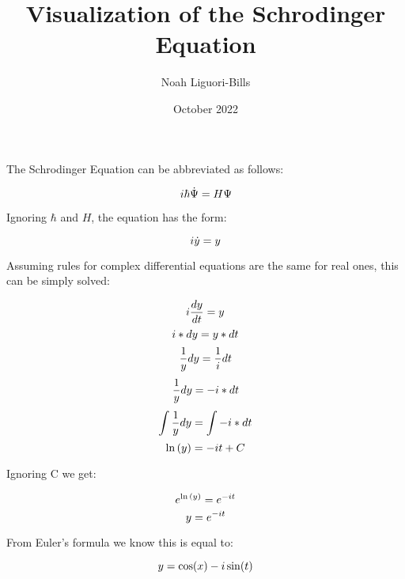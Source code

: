 \documentclass{article}
\title{Visualization of the Schrodinger Equation}
\author{Noah Liguori-Bills }
\date{October 2022}
\begin{document}
\maketitle

\begin{center}
The Schrodinger Equation can be abbreviated as follows:
\end{center}
\[i{\textstyle \hbar }\dot{\Psi}\\=H\Psi\]
\begin{center}
Ignoring \({\textstyle \hbar }\) and \(H\), the equation has the form:
\end{center}
\[i\dot{y}\\=y\]
\begin{center}
Assuming rules for complex differential equations are the same for real ones, this can be simply solved:
\end{center}
\[i\frac{dy}{dt}\\=y\]
\[i*dy\\=y*dt\]
\[\frac{1}{y}dy\\=\frac{1}{i}dt\]
\[\frac{1}{y}dy\\=-i*dt\]
\[\int\frac{1}{y}dy\\=\int-i*dt\]
\[\ln{(y)}\\=-it+C\]
\begin{center}
Ignoring C we get:
\end{center}
\[e^{\ln{(y)}}\\=e^{-it}\]
\[y\\=e^{-it}\]
\begin{center}
From Euler's formula we know this is equal to:
\end{center}
\[y\\=\cos(x)-i\sin(t)\]
\end{document}
